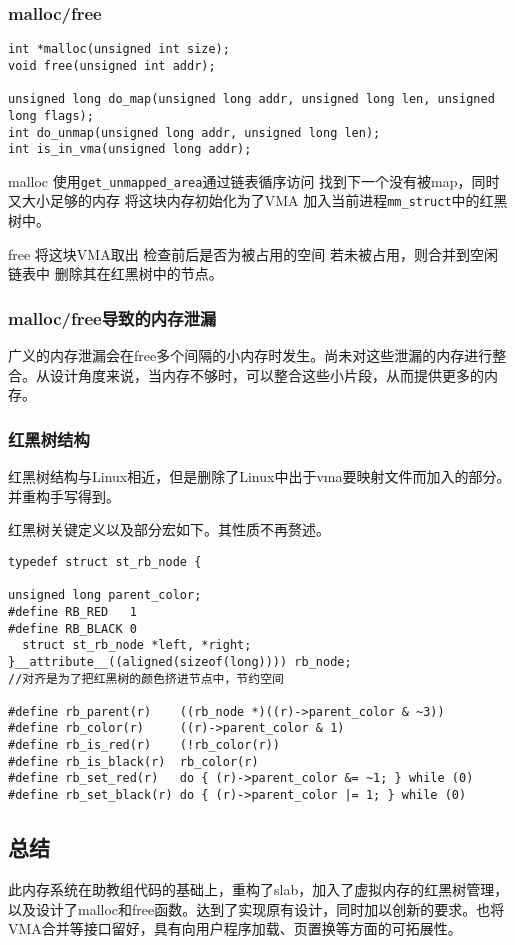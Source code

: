 \subsubsection{malloc/free}

\begin{lstlisting}[caption=malloc/free接口]
int *malloc(unsigned int size);
void free(unsigned int addr);

unsigned long do_map(unsigned long addr, unsigned long len, unsigned long flags);
int do_unmap(unsigned long addr, unsigned long len);
int is_in_vma(unsigned long addr);
\end{lstlisting}

malloc
使用\texttt{get\_unmapped\_area}通过链表循序访问
找到下一个没有被map，同时又大小足够的内存
将这块内存初始化为了VMA
加入当前进程\texttt{mm\_struct}中的红黑树中。

free
将这块VMA取出
检查前后是否为被占用的空间
若未被占用，则合并到空闲链表中
删除其在红黑树中的节点。


\subsubsection{malloc/free导致的内存泄漏}

广义的内存泄漏会在free多个间隔的小内存时发生。尚未对这些泄漏的内存进行整合。从设计角度来说，当内存不够时，可以整合这些小片段，从而提供更多的内存。

\subsubsection{红黑树结构}

红黑树结构与Linux相近，但是删除了Linux中出于vma要映射文件而加入的部分。并重构手写得到。

红黑树关键定义以及部分宏如下。其性质不再赘述。

\begin{lstlisting}[caption=\texttt{struct st\_rb\_node}]
typedef struct st_rb_node {

unsigned long parent_color;
#define RB_RED   1
#define RB_BLACK 0
  struct st_rb_node *left, *right;
}__attribute__((aligned(sizeof(long)))) rb_node;
//对齐是为了把红黑树的颜色挤进节点中，节约空间

#define rb_parent(r)    ((rb_node *)((r)->parent_color & ~3))
#define rb_color(r)     ((r)->parent_color & 1)
#define rb_is_red(r)    (!rb_color(r))
#define rb_is_black(r)  rb_color(r)
#define rb_set_red(r)   do { (r)->parent_color &= ~1; } while (0)
#define rb_set_black(r) do { (r)->parent_color |= 1; } while (0)
\end{lstlisting}


\subsection{总结}

此内存系统在助教组代码的基础上，重构了slab，加入了虚拟内存的红黑树管理，以及设计了malloc和free函数。达到了实现原有设计，同时加以创新的要求。也将VMA合并等接口留好，具有向用户程序加载、页置换等方面的可拓展性。

